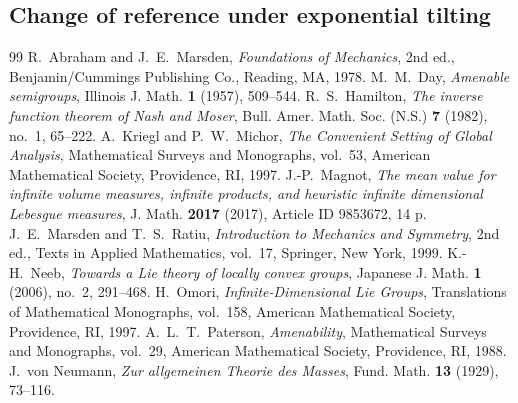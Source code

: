 \documentclass[10pt,a4paper]{amsart}
\begin{document}
\subsection{Change of reference under exponential tilting}
\label{subsec:change-reference}


\begin{thebibliography}{99}
 R.~Abraham and J.~E.~Marsden, \emph{Foundations of Mechanics}, 2nd ed., Benjamin/Cummings Publishing Co., Reading, MA, 1978.
 M.~M.~Day, \emph{Amenable semigroups}, Illinois J. Math. \textbf{1} (1957), 509--544.
 R.~S.~Hamilton, \emph{The inverse function theorem of Nash and Moser}, Bull. Amer. Math. Soc. (N.S.) \textbf{7} (1982), no.~1, 65--222.
 A.~Kriegl and P.~W.~Michor, \emph{The Convenient Setting of Global Analysis}, Mathematical Surveys and Monographs, vol.~53, American Mathematical Society, Providence, RI, 1997.
 J.-P.~Magnot, \emph{The mean value for infinite volume measures, infinite products, and heuristic infinite dimensional Lebesgue measures}, J. Math. \textbf{2017} (2017), Article ID 9853672, 14 p.
 J.~E.~Marsden and T.~S.~Ratiu, \emph{Introduction to Mechanics and Symmetry}, 2nd ed., Texts in Applied Mathematics, vol.~17, Springer, New York, 1999.
 K.-H.~Neeb, \emph{Towards a Lie theory of locally convex groups}, Japanese J. Math. \textbf{1} (2006), no.~2, 291--468.
 H.~Omori, \emph{Infinite-Dimensional Lie Groups}, Translations of Mathematical Monographs, vol.~158, American Mathematical Society, Providence, RI, 1997.
 A.~L.~T.~Paterson, \emph{Amenability}, Mathematical Surveys and Monographs, vol.~29, American Mathematical Society, Providence, RI, 1988.
 J.~von Neumann, \emph{Zur allgemeinen Theorie des Masses}, Fund. Math. \textbf{13} (1929), 73--116.
\end{thebibliography}
\end{document}
